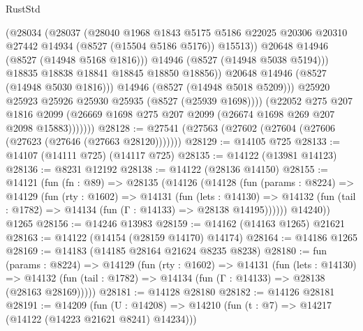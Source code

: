 \begin{lexlean}{RustStd}
\begin{coremodule}
                          (@28034
                            (@28037
                              (@28040
                                @1968
                                @1843
                                @5175
                                @5186
                                @22025
                                @20306
                                @20310
                                @27442
                                @14934
                                (@8527 (@15504 @5186 @5176))
                                @15513))
                            @20648
                            @14946
                            (@8527 (@14948 @5168 @1816)))
                          @14946
                          (@8527 (@14948 @5038 @5194)))
                        @18835
                        @18838
                        @18841
                        @18845
                        @18850
                        @18856))
                    @20648
                    @14946
                    (@8527 (@14948 @5030 @1816)))
                  @14946
                  (@8527 (@14948 @5018 @5209)))
                @25920
                @25923
                @25926
                @25930
                @25935
                (@8527 (@25939 @1698))))
            (@22052
              @275
              @207
              @1816
              @2099
              (@26669 @1698 @275 @207 @2099 (@26674 @1698 @269 @207 @2098 @15883)))))))
@28128 := @27541 (@27563 (@27602 (@27604 (@27606 (@27623 (@27646 (@27663 @28120)))))))
@28129 := @14105 @725
@28133 := @14107 (@14111 @725) (@14117 @725)
@28135 := @14122 (@13981 @14123)
@28136 := @8231 @12192
@28138 := @14122 (@28136 @14150)
@28155 := @14121
    (fun (fn : @89) =>
    @28135
      (@14126
        (@14128
          (fun (params : @8224) =>
          @14129
            (fun (rty : @1602) =>
            @14131
              (fun (lets : @14130) =>
              @14132 (fun (tail : @1782) => @14134 (fun (Γ : @14133) => @28138 @14195))))))
        @14240))
    @1265
@28156 := @14246 @13983
@28159 := @14162 (@14163 @1265) @21621
@28163 := @14122 (@14154 (@28159 @14170) @14174)
@28164 := @14186 @1265
@28169 := @14183 (@14185 @28164 @21624 @8235 @8238)
@28180 := fun (params : @8224) =>
  @14129
    (fun (rty : @1602) =>
    @14131
      (fun (lets : @14130) =>
      @14132 (fun (tail : @1782) => @14134 (fun (Γ : @14133) => @28138 (@28163 @28169)))))
@28181 := @14128 @28180
@28182 := @14126 @28181
@28191 := @14209
    (fun (U : @14208) => @14210 (fun (t : @7) => @14217 (@14122 (@14223 @21621 @8241) @14234)))

\end{coremodule}
\end{lexlean}
